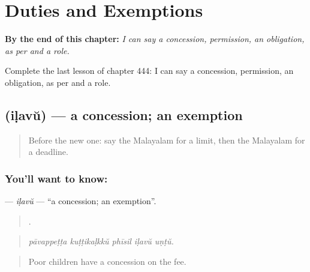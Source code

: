 
\chapter{Duties and Exemptions}
\label{ch:ml-duties-and-exemptions}

\begin{chapteropening}
\textbf{By the end of this chapter:} \emph{I can say a concession, permission, an obligation, as per and a role.}

Complete the last lesson of chapter 444: I can say a concession, permission, an obligation, as per and a role.
\end{chapteropening}

\section[\texorpdfstring{\ml{ഇളവ്} (iḷavŭ)}{ഇളവ് (iḷavŭ)}]{ (iḷavŭ) — a concession; an exemption}

\label{lesson:ML-C444-ilavu}



\begin{quote}
Before the new one: say the Malayalam for a limit, then the Malayalam for a deadline.
\end{quote}

\subsection*{You'll want to know: }
\textbf{} — \emph{iḷavŭ} — \textquotedblleft{}a concession; an exemption\textquotedblright{}.

\begin{quote}
    .
\end{quote}

\begin{quote}
\emph{pāvappeṭṭa kuṭṭikaḷkkŭ phīsil iḷavŭ uṇṭŭ.}
\end{quote}

\begin{quote}
Poor children have a concession on the fee.
\end{quote}


